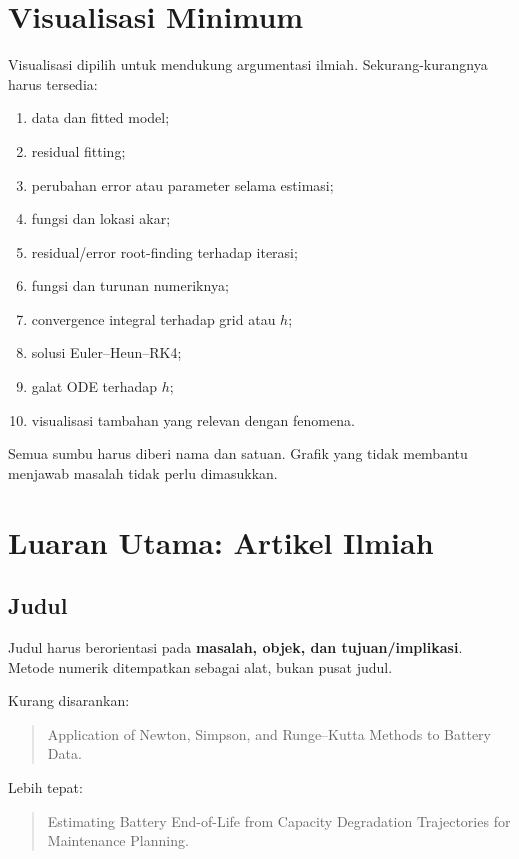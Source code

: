 \documentclass[11pt,a4paper]{article}
\begin{document}
\section{Visualisasi Minimum}

Visualisasi dipilih untuk mendukung argumentasi ilmiah. Sekurang-kurangnya harus tersedia:
\begin{enumerate}
    \item data dan fitted model;
    \item residual fitting;
    \item perubahan error atau parameter selama estimasi;
    \item fungsi dan lokasi akar;
    \item residual/error root-finding terhadap iterasi;
    \item fungsi dan turunan numeriknya;
    \item convergence integral terhadap grid atau $h$;
    \item solusi Euler--Heun--RK4;
    \item galat ODE terhadap $h$;
    \item visualisasi tambahan yang relevan dengan fenomena.
\end{enumerate}

Semua sumbu harus diberi nama dan satuan. Grafik yang tidak membantu menjawab masalah tidak perlu dimasukkan.

\section{Luaran Utama: Artikel Ilmiah}

\subsection{Judul}

Judul harus berorientasi pada \textbf{masalah, objek, dan tujuan/implikasi}. Metode numerik ditempatkan sebagai alat, bukan pusat judul.

Kurang disarankan:
\begin{quote}
Application of Newton, Simpson, and Runge--Kutta Methods to Battery Data.
\end{quote}

Lebih tepat:
\begin{quote}
Estimating Battery End-of-Life from Capacity Degradation Trajectories for Maintenance Planning.
\end{quote}
\end{document}
